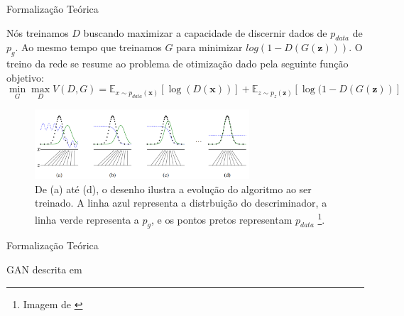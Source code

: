 \documentclass[10pt]{beamer}
\begin{document}
\begin{frame}[fragile]{Formalização Teórica}
	
	Nós treinamos $D$ buscando maximizar
	a capacidade de discernir dados de $p_{data}$ de $p_g$. Ao
	mesmo tempo que treinamos $G$ para minimizar $log(1-D(G(\bm z)))$.
	O treino da rede se resume ao problema de otimização dado
	pela seguinte função objetivo:
	\small
    $$
    \min_{G} \max_D V(D,G) =
    \mathbb{E}_{x\sim p_{data}(\bm x)}\left[\log{(D(\bm x))}\right]+
    \mathbb{E}_{z\sim p_z(\bm z)}\left[\log(1-D(G(\bm z))\right]
    $$

    \begin{figure}[H]
        \centering
        \includegraphics[width=8cm]{images/gan-algorithmscheme.png}
        \caption{De (a) até (d), o desenho ilustra a evolução do
        algoritmo ao ser treinado. A linha azul representa a
        distrbuição do descriminador, a linha verde representa
        a $p_g$, e os pontos pretos representam $p_{data}$
        \footnote{Imagem de \citet{goodfellow2014}}.}
    \end{figure}
	 
\end{frame}

\begin{frame}[fragile]{Formalização Teórica}

  \footnotesize
  \begin{algorithm}[H]
  \SetAlgoLined
   \caption{GAN descrita em \citet{goodfellow2014}}
  \end{algorithm}

\end{frame}
\end{document}
